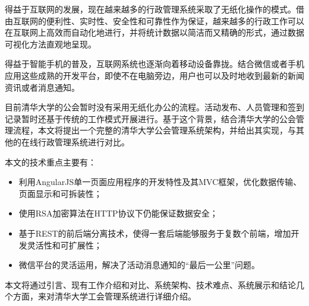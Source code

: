 \begin{cabstract}
  
  得益于互联网的发展，现在越来越多的行政管理系统采取了无纸化操作的模式。借由互联网的便利性、实时性、安全性和可靠性作为保证，越来越多的行政工作可以在互联网上高效而自动化地进行，并将统计数据以简洁而又精确的形式，通过数据可视化方法直观地呈现。

  得益于智能手机的普及，互联网系统也逐渐向着移动设备靠拢。结合微信或者手机应用这些成熟的开发平台，即使不在电脑旁边，用户也可以及时地收到最新的新闻资讯或者消息通知。

  目前清华大学的公会暂时没有采用无纸化办公的流程。活动发布、人员管理和签到记录暂时还基于传统的工作模式开展进行。基于这个背景，结合清华大学的公会管理流程，本文将提出一个完整的清华大学公会管理系统架构，并给出其实现，与其他的在线行政管理系统进行对比。

  本文的技术重点主要有：
  \begin{itemize}
    \item 利用AngularJS单一页面应用程序的开发特性及其MVC框架，优化数据传输、页面显示和可拆装性；
    \item 使用RSA加密算法在HTTP协议下仍能保证数据安全；
    \item 基于REST的前后端分离技术，使得一套后端能够服务于复数个前端，增加开发灵活性和可扩展性；
    \item 微信平台的灵活运用，解决了活动消息通知的“最后一公里”问题。
  \end{itemize}

  本文将通过引言、现有工作介绍和对比、系统架构、技术难点、系统展示和结论几个方面，来对清华大学工会管理系统进行详细介绍。

\end{cabstract}


